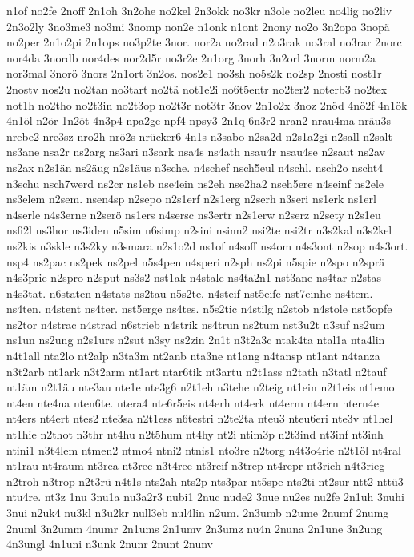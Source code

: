 {n1of
no2fe
2noff
2n1oh
3n2ohe
no2kel
2n3okk
no3kr
n3ole
no2leu
no4lig
no2liv
2n3o2ly
3no3me3
no3mi
3nomp
non2e
n1onk
n1ont
2nony
no2o
3n2opa
3nopä
no2per
2n1o2pi
2n1ops
no3p2te
3nor.
nor2a
no2rad
n2o3rak
no3ral
no3rar
2norc
nor4da
3nordb
nor4des
nor2d5r
no3r2e
2n1org
3norh
3n2orl
3norm
norm2a
nor3mal
3norö
3nors
2n1ort
3n2os.
nos2e1
no3sh
no5s2k
no2sp
2nosti
nost1r
2nostv
nos2u
no2tan
no3tart
no2tä
not1e2i
no6t5entr
no2ter2
noterb3
no2tex
not1h
no2tho
no2t3in
no2t3op
no2t3r
not3tr
3nov
2n1o2x
3noz
2nöd
4nö2f
4n1ök
4n1öl
n2ör
1n2öt
4n3p4
npa2ge
npf4
npsy3
2n1q
6n3r2
nran2
nrau4ma
nräu3s
nrebe2
nre3sz
nro2h
nrö2s
nrücker6
4n1s
n3sabo
n2sa2d
n2s1a2gi
n2sall
n2salt
ns3ane
nsa2r
ns2arg
ns3ari
n3sark
nsa4s
ns4ath
nsau4r
nsau4se
n2saut
ns2av
ns2ax
n2s1än
ns2äug
n2s1äus
n3sche.
n4schef
nsch5eul
n4schl.
nsch2o
nscht4
n3schu
nsch7werd
ns2cr
ns1eb
nse4ein
ns2eh
nse2ha2
nseh5ere
n4seinf
ns2ele
ns3elem
n2sem.
nsen4sp
n2sepo
n2s1erf
n2s1erg
n2serh
n3seri
ns1erk
ns1erl
n4serle
n4s3erne
n2serö
ns1ers
n4sersc
ns3ertr
n2s1erw
n2serz
n2sety
n2s1eu
nsfi2l
ns3hor
ns3iden
n5sim
n6simp
n2sini
nsinn2
nsi2te
nsi2tr
n3s2kal
n3s2kel
ns2kis
n3skle
n3s2ky
n3smara
n2s1o2d
ns1of
n4soff
ns4om
n4s3ont
n2sop
n4s3ort.
nsp4
ns2pac
ns2pek
ns2pel
n5s4pen
n4speri
n2sph
ns2pi
n5spie
n2spo
n2sprä
n4s3prie
n2spro
n2sput
ns3s2
nst1ak
n4stale
ns4ta2n1
nst3ane
ns4tar
n2stas
n4s3tat.
n6staten
n4stats
ns2tau
n5s2te.
n4steif
nst5eife
nst7einhe
ns4tem.
ns4ten.
n4stent
ns4ter.
nst5erge
ns4tes.
n5s2tic
n4stilg
n2stob
n4stole
nst5opfe
ns2tor
n4strac
n4strad
n6strieb
n4strik
ns4trun
ns2tum
nst3u2t
n3suf
ns2um
ns1un
ns2ung
n2s1urs
n2sut
n3sy
ns2zin
2n1t
n3t2a3c
ntak4ta
ntal1a
nta4lin
n4t1all
nta2lo
nt2alp
n3ta3m
nt2anb
nta3ne
nt1ang
n4tansp
nt1ant
n4tanza
n3t2arb
nt1ark
n3t2arm
nt1art
ntar6tik
nt3artu
n2t1ass
n2tath
n3tatl
n2tauf
nt1äm
n2t1äu
nte3au
nte1e
nte3g6
n2t1eh
n3tehe
n2teig
nt1ein
n2t1eis
nt1emo
nt4en
nte4na
nten6te.
ntera4
nte6r5eis
nt4erh
nt4erk
nt4erm
nt4ern
ntern4e
nt4ers
nt4ert
ntes2
nte3sa
n2t1ess
n6testri
n2te2ta
nteu3
nteu6eri
nte3v
nt1hel
nt1hie
n2thot
n3thr
nt4hu
n2t5hum
nt4hy
nt2i
ntim3p
n2t3ind
nt3inf
nt3inh
ntini1
n3t4lem
ntmen2
ntmo4
ntni2
ntnis1
nto3re
n2torg
n4t3o4rie
n2t1öl
nt4ral
nt1rau
nt4raum
nt3rea
nt3rec
n3t4ree
nt3reif
n3trep
nt4repr
nt3rich
n4t3rieg
n2troh
n3trop
n2t3rü
n4t1s
nts2ah
nts2p
nts3par
nt5spe
nts2ti
nt2sur
ntt2
nttü3
ntu4re.
nt3z
1nu
3nu1a
nu3a2r3
nubi1
2nuc
nude2
3nue
nu2es
nu2fe
2n1uh
3nuhi
3nui
n2uk4
nu3kl
n3u2kr
null3eb
nul4lin
n2um.
2n3umb
n2ume
2numf
2numg
2numl
3n2umm
4numr
2n1ums
2n1umv
2n3umz
nu4n
2nuna
2n1une
3n2ung
4n3ungl
4n1uni
n3unk
2nunr
2nunt
2nunv
}
